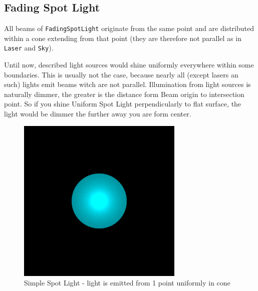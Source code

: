 \documentclass[12pt, letterpaper]{article}
\begin{document}
\subsection{Fading Spot Light}

All beams of \verb|FadingSpotLight| originate from the same point and are distributed within a cone extending from that point (they are therefore not parallel as in \verb|Laser| and \verb|Sky|).

Until now, described light sources would shine uniformly everywhere within some boundaries. This is usually not the case, because nearly all (except lasers an such) lights emit beams witch are not parallel. 
Illumination from light sources is naturally dimmer, the greater is the distance form Beam origin to intersection point. So if you shine Uniform Spot Light perpendicularly to flat surface, the light would be dimmer the further away you are form center.
\begin{figure}[H]
\centering 
\includegraphics[scale=0.5]{SSL.png}
\caption{Simple Spot Light - light is emitted from 1 point uniformly in cone}
\end{figure}
\end{document}
